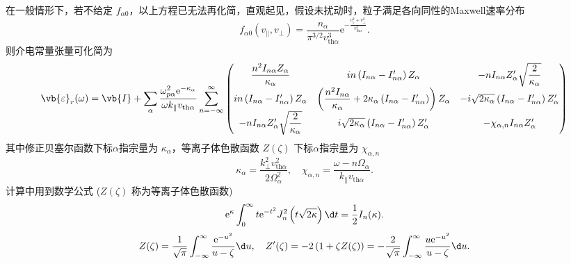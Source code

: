 在一般情形下，若不给定 \(f_{\alpha0}\)，以上方程已无法再化简，直观起见，假设未扰动时，粒子满足各向同性的Maxwell速率分布
\begin{equation*}
	f_{\alpha0}\left(v_{\parallel},v_\perp\right) = \frac{n_\alpha}{\pi^{3/2}v_{\mathrm{th}\alpha}^3}\mathrm{e}^{-\frac{v_{\parallel}^2 + v_\perp^2}{v_{\mathrm{th}\alpha}^2}}.
\end{equation*}
则介电常量张量可化简为
\begin{equation*}
	\vb{\varepsilon}_r(\omega) = \vb{I} + \sum_\alpha\frac{\omega_{p\alpha}^2\mathrm{e}^{-\kappa_\alpha}}{\omega k_{\parallel}v_{\mathrm{th}\alpha}}
	\sum_{n=-\infty}^{\infty}
	\begin{pmatrix}
		\dfrac{n^2I_{n\alpha}Z_\alpha}{\kappa_\alpha}               & in\left(I_{n\alpha}-I_{n\alpha}^\prime\right)Z_\alpha                                                                & -nI_{n\alpha}Z_\alpha^\prime\sqrt{\dfrac{2}{\kappa_\alpha}}                       \\[6pt]
		in\left(I_{n\alpha}-I_{n\alpha}^\prime\right)Z_\alpha       & \left(\dfrac{n^2I_{n\alpha}}{\kappa_\alpha}+2\kappa_\alpha\left(I_{n\alpha}-I_{n\alpha}^\prime\right)\right)Z_\alpha & -i\sqrt{2\kappa_\alpha}\left(I_{n\alpha}-I_{n\alpha}^\prime\right)Z_\alpha^\prime \\[6pt]
		-nI_{n\alpha}Z_\alpha^\prime\sqrt{\dfrac{2}{\kappa_\alpha}} & i\sqrt{2\kappa_\alpha}\left(I_{n\alpha}-I_{n\alpha}^\prime\right)Z_\alpha^\prime                                     & -\chi_{\alpha,n}I_{n\alpha}Z_\alpha^\prime
	\end{pmatrix}
\end{equation*}
其中修正贝塞尔函数下标\(\alpha\)指宗量为 \(\kappa_\alpha\)，等离子体色散函数 \(Z(\zeta)\) 下标\(\alpha\)指宗量为 \(\chi_{\alpha,n}\)
\begin{equation*}
	\kappa_\alpha = \frac{k_\perp^2v_{\mathrm{th}\alpha}^2}{2\Omega_\alpha^2}, \quad \chi_{\alpha,n} = \frac{\omega - n\Omega_\alpha}{k_{\parallel}v_{\mathrm{th}\alpha}}.
\end{equation*}
计算中用到数学公式 (\(Z(\zeta)\) 称为等离子体色散函数)
\begin{equation*}
	\mathrm{e}^{\kappa}\int_{0}^{\infty}t\mathrm{e}^{-t^2}J_n^2\left(t\sqrt{2\kappa}\right)\d t = \frac{1}{2}I_n(\kappa).
\end{equation*}
\begin{equation*}
	Z(\zeta) = \frac{1}{\sqrt{\pi}}\int_{-\infty}^{\infty}\frac{\mathrm{e}^{-u^2}}{u-\zeta}\d u, \quad Z'(\zeta) = -2\left(1+\zeta Z(\zeta)\right) = -\frac{2}{\sqrt{\pi}}\int_{-\infty}^{\infty}\frac{u\mathrm{e}^{-u^2}}{u-\zeta}\d u.
\end{equation*}

